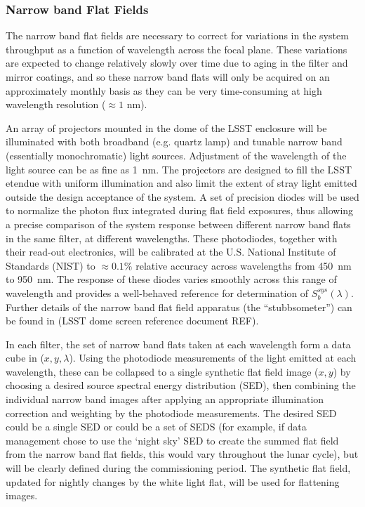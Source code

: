 \documentclass[12pt,preprint]{aastex}
\begin{document}
\subsubsection{Narrow band Flat Fields}
\label{sec:narrowband}

The narrow band flat fields are necessary to correct for variations in
the system throughput as a function of wavelength across the focal
plane. These variations are expected to change relatively slowly over
time due to aging in the filter and mirror coatings, and so these
narrow band flats will only be acquired on an approximately monthly
basis as they can be very time-consuming at high wavelength resolution
($\approx1$ nm).

An array of projectors mounted in the dome of the LSST enclosure will
be illuminated with both broadband (e.g. quartz lamp) and tunable
narrow band (essentially monochromatic) light sources.  Adjustment of
the wavelength of the light source can be as fine as 1~nm. The
projectors are designed to fill the LSST etendue with uniform
illumination and also limit the extent of stray light emitted outside
the design acceptance of the system. A set of precision diodes will be
used to normalize the photon flux integrated during flat field
exposures, thus allowing a precise comparison of the system response
between different narrow band flats in the same filter, at different
wavelengths.  These photodiodes, together with their read-out
electronics, will be calibrated at the U.S. National Institute of
Standards (NIST) to $\approx0.1\%$ relative accuracy across
wavelengths from 450~nm to 950~nm. The response of these diodes varies
smoothly across this range of wavelength and provides a well-behaved
reference for determination of $S_b^{sys}(\lambda)$.  Further details
of the narrow band flat field apparatus (the ``stubbsometer'') can be
found in (LSST dome screen reference document REF).

In each filter, the set of narrow band flats taken at each wavelength
form a data cube in ($x,y,\lambda$). Using the photodiode measurements
of the light emitted at each wavelength, these can be collapsed to a
single synthetic flat field image ($x,y$) by choosing a desired source
spectral energy distribution (SED), then combining the individual narrow
band images after applying an appropriate illumination correction and
weighting by the photodiode measurements. The desired
SED could be a single SED or could be a set of SEDS (for example, if
data management chose to use the `night sky' SED to create the summed
flat field from the narrow band flat fields, this would vary
throughout the lunar cycle), but will be clearly defined during the
commissioning period. The synthetic flat field, updated for nightly
changes by the white light flat, will be used for flattening images.
\end{document}
